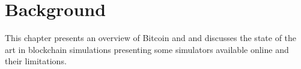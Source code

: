 \chapter{Background}\label{ch:background}

This chapter presents an overview of Bitcoin and \omnetpp{} and discusses the
state of the art in blockchain simulations presenting some simulators available
online and their limitations.




